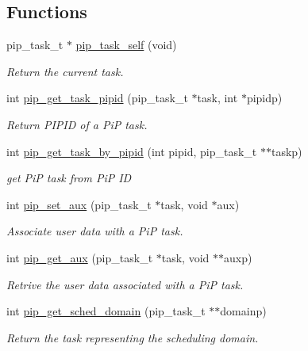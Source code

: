 \documentclass[twoside]{book}
\begin{document}
\subsection*{Functions}
\begin{DoxyCompactItemize}
\item 
pip\-\_\-task\-\_\-t $\ast$ \hyperlink{group__ulp-6-misc_gaf09a1abfd580696c74d4aa7be8255ad0}{pip\-\_\-task\-\_\-self} (void)
\begin{DoxyCompactList}\small\item\em Return the current task. \end{DoxyCompactList}\item 
int \hyperlink{group__ulp-6-misc_ga14a1b03ec6564885a5dd97dbc27167aa}{pip\-\_\-get\-\_\-task\-\_\-pipid} (pip\-\_\-task\-\_\-t $\ast$task, int $\ast$pipidp)
\begin{DoxyCompactList}\small\item\em Return P\-I\-P\-I\-D of a Pi\-P task. \end{DoxyCompactList}\item 
int \hyperlink{group__ulp-6-misc_ga147decca4226959d822b73b7c31a4465}{pip\-\_\-get\-\_\-task\-\_\-by\-\_\-pipid} (int pipid, pip\-\_\-task\-\_\-t $\ast$$\ast$taskp)
\begin{DoxyCompactList}\small\item\em get Pi\-P task from Pi\-P I\-D \end{DoxyCompactList}\item 
int \hyperlink{group__ulp-6-misc_gacfd984207deedf86edddbb72c5d4e883}{pip\-\_\-set\-\_\-aux} (pip\-\_\-task\-\_\-t $\ast$task, void $\ast$aux)
\begin{DoxyCompactList}\small\item\em Associate user data with a Pi\-P task. \end{DoxyCompactList}\item 
int \hyperlink{group__ulp-6-misc_ga8bf51911ca0b18340b29fae90ab59b03}{pip\-\_\-get\-\_\-aux} (pip\-\_\-task\-\_\-t $\ast$task, void $\ast$$\ast$auxp)
\begin{DoxyCompactList}\small\item\em Retrive the user data associated with a Pi\-P task. \end{DoxyCompactList}\item 
int \hyperlink{group__ulp-6-misc_ga32119e3a41a4073b52ade76bf87a5589}{pip\-\_\-get\-\_\-sched\-\_\-domain} (pip\-\_\-task\-\_\-t $\ast$$\ast$domainp)
\begin{DoxyCompactList}\small\item\em Return the task representing the scheduling domain. \end{DoxyCompactList}\end{DoxyCompactItemize}
\end{document}
